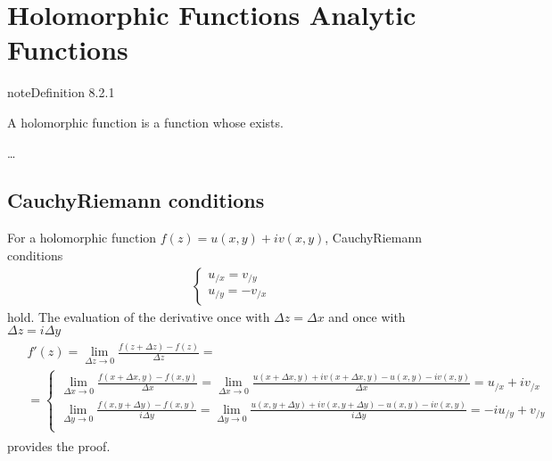 \documentclass[letterpaper,10pt,english]{jupyterBook}
\begin{document}
\section{Holomorphic Functions \sphinxhyphen{} Analytic Functions}
\label{\detokenize{ch/complex/analysis:holomorphic-functions-analytic-functions}}\label{\detokenize{ch/complex/analysis:complex-analysis-holo-fun}}\label{ch/complex/analysis:definition-0}
\begin{sphinxadmonition}{note}{Definition 8.2.1}



\sphinxAtStartPar
A holomorphic function is a function whose {\hyperref[\detokenize{ch/complex/analysis:complex-analysis-fun-derivative}]{}} exists.
\end{sphinxadmonition}

\sphinxAtStartPar
{} …


\subsection{Cauchy\sphinxhyphen{}Riemann conditions}
\label{\detokenize{ch/complex/analysis:cauchy-riemann-conditions}}\label{\detokenize{ch/complex/analysis:complex-analysis-holo-fun-cauchy-riemann}}
\sphinxAtStartPar
For a holomorphic function \(f(z) = u(x,y) + i v(x,y)\), Cauchy\sphinxhyphen{}Riemann conditions
\begin{equation*}
\begin{split}\begin{cases}
u_{/x} = v_{/y} \\
u_{/y} = - v_{/x}
\end{cases}\end{split}
\end{equation*}
\sphinxAtStartPar
hold. The evaluation of the derivative once with \(\Delta z = \Delta x\) and once with \(\Delta z = i \Delta y\)
\begin{equation*}
\begin{split}\begin{aligned}
& f'(z) = \lim_{\Delta z \rightarrow 0} \frac{f(z+\Delta z) - f(z)}{\Delta z} = \\ 
& = \left\{
\begin{aligned}
  \lim_{\Delta x \rightarrow 0} \frac{f(x+\Delta x,y) - f(x,y)}{\Delta x} = \lim_{\Delta x \rightarrow 0} \frac{u(x+\Delta x,y) + i v(x+\Delta x,y) - u(x,y) - i v(x,y)}{\Delta x} = u_{/x} + i v_{/x} \\ 
  \lim_{\Delta y \rightarrow 0} \frac{f(x,y+\Delta y) - f(x,y)}{i \Delta y} = \lim_{\Delta y \rightarrow 0}  \frac{u(x,y+\Delta y) + i v(x,y+\Delta y) - u(x,y) - i v(x,y)}{i \Delta y} = -i u_{/y} + v_{/y} \\ 
\end{aligned}
\right.
\end{aligned}\end{split}
\end{equation*}
\sphinxAtStartPar
provides the proof.
\end{document}
